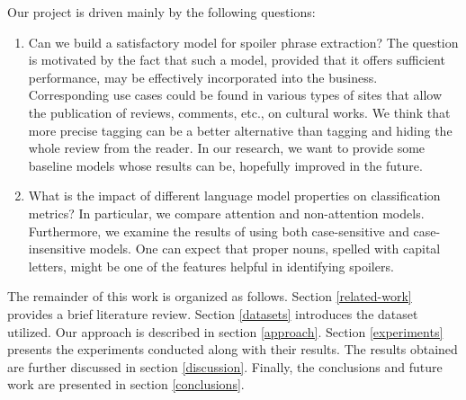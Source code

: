 \documentclass[11pt]{article}
\begin{document}

Our project is driven mainly by the following questions: 
\begin{enumerate}
    \item Can we build a satisfactory model for spoiler phrase extraction? The question is motivated by the fact that such a model, provided that it offers sufficient performance, may be effectively incorporated into the business. Corresponding use cases could be found in various types of sites that allow the publication of reviews, comments, etc., on cultural works. We think that more precise tagging can be a better alternative than tagging and hiding the whole review from the reader. In our research, we want to provide some baseline models whose results can be, hopefully improved in the future.
    \item What is the impact of different language model properties on classification metrics? In particular, we compare attention and non-attention models. Furthermore, we examine the results of using both case-sensitive and case-insensitive models. One can expect that proper nouns, spelled with capital letters, might be one of the features helpful in identifying spoilers.
\end{enumerate}

The remainder of this work is organized as follows. Section \ref{related-work} provides a brief literature review. Section \ref{datasets} introduces the dataset utilized. Our approach is described in section \ref{approach}. Section \ref{experiments} presents the experiments conducted along with their results. The results obtained are further discussed in section \ref{discussion}. Finally, the conclusions and future work are presented in section \ref{conclusions}.
\end{document}
